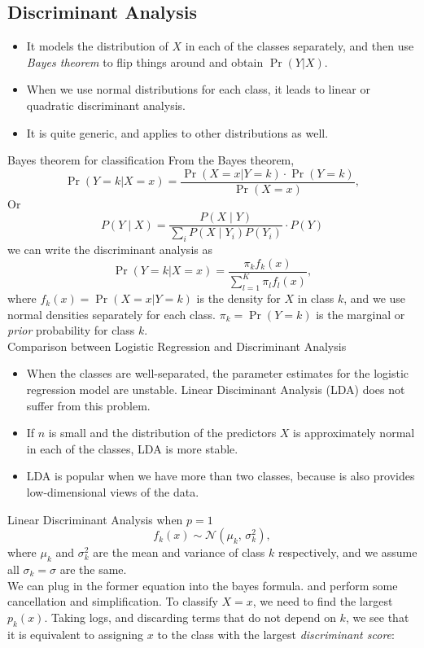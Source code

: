 \documentclass[11pt, a4paper]{article}
\begin{document}
\subsection{Discriminant Analysis}
\begin{itemize}
  \item It models the distribution of $X$ in each of the classes separately, and then use \emph{Bayes theorem} to flip things around and obtain $\operatorname{Pr}(Y|X)$.
  \item When we use normal distributions for each class, it leads to linear or quadratic discriminant analysis.
  \item It is quite generic, and applies to other distributions as well.
\end{itemize}
Bayes theorem for classification
From the Bayes theorem, 
\[
\operatorname{Pr}(Y=k|X=x)=\frac{\operatorname{Pr}(X=x|Y=k)\cdot\operatorname{Pr}(Y=k)}{\operatorname{Pr}(X=x)},
\]
Or
\[
P(Y \mid X) = \frac{P(X \mid Y)}{\sum_i {P(X \mid Y_i) P(Y_i)}} \cdot P(Y) 
\]
we can write the discriminant analysis as
\[
  \operatorname{Pr}(Y=k|X=x)=\frac{\pi_kf_k(x)}{\sum_{l=1}^K\pi_lf_l(x)},
\]
where $f_k(x)=\operatorname{Pr}(X=x|Y=k)$ is the density for $X$ in class $k$, and we use normal densities separately for each class. $\pi_k=\operatorname{Pr}(Y=k)$ is the marginal or \emph{prior} probability for class $k$.\\[1mm]
Comparison between Logistic Regression and Discriminant Analysis
\begin{itemize}
  \item When the classes are well-separated, the parameter estimates for the logistic regression model are unstable. Linear Disciminant Analysis (LDA) does not suffer from this problem.
  \item If $n$ is small and the distribution of the predictors $X$ is approximately normal in each of the classes, LDA is more stable.
  \item LDA is popular when we have more than two classes, because is also provides low-dimensional views of the data.
\end{itemize}
Linear Discriminant Analysis when $p=1$\\
\[
f_k(x) \sim \mathcal{N}(\mu_k,\,\sigma_k^2),
\]
where $\mu_k$ and $\sigma_k^2$ are the mean and variance of class $k$ respectively, and we assume all $\sigma_k=\sigma$ are the same.\\
We can plug in the former equation into the bayes formula. and perform some cancellation and simplification. To classify $X=x$, we need to find the largest $p_k(x)$. Taking logs, and discarding terms that do not depend on $k$, we see that it is equivalent to assigning $x$ to the class with the largest \emph{discriminant score}:
\end{document}
